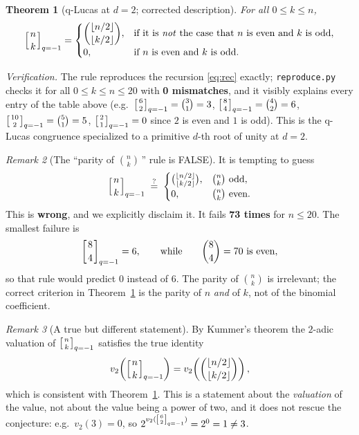 \documentclass[11pt]{article}
\newtheorem{theorem}{Theorem}
\theoremstyle{definition}
\theoremstyle{remark}
\newtheorem{remark}[theorem]{Remark}
\newcommand{\qbinm}[2]{\left[\genfrac{}{}{0pt}{}{#1}{#2}\right]_{q=-1}}
\begin{document}
\begin{theorem}[q-Lucas at $d=2$; corrected description]\label{thm:lucas}
For all $0 \le k \le n$,
\[
\qbinm{n}{k} =
\begin{cases}
\dbinom{\lfloor n/2\rfloor}{\lfloor k/2\rfloor}, & \text{if it is \emph{not}
the case that } n \text{ is even and } k \text{ is odd},\\[2mm]
0, & \text{if } n \text{ is even and } k \text{ is odd}.
\end{cases}
\]
\end{theorem}

\emph{Verification.} The rule reproduces the recursion \eqref{eq:rec} exactly;
\texttt{reproduce.py} checks it for all $0 \le k \le n \le 20$ with
\textbf{0 mismatches}, and it visibly explains every entry of the table above
(e.g.\ $\qbinm{6}{2}=\binom{3}{1}=3$, $\qbinm{8}{4}=\binom{4}{2}=6$,
$\qbinm{10}{2}=\binom{5}{1}=5$, $\qbinm{2}{1}=0$ since $2$ is even and $1$ is
odd). This is the q-Lucas congruence specialized to a primitive $d$-th root of
unity at $d=2$.

\begin{remark}[The ``parity of $\binom{n}{k}$\,'' rule is FALSE]
It is tempting to guess
\[
\qbinm{n}{k} \;\overset{?}{=}\;
\begin{cases}
\binom{\lfloor n/2\rfloor}{\lfloor k/2\rfloor}, & \binom{n}{k} \text{ odd},\\
0, & \binom{n}{k} \text{ even}.
\end{cases}
\]
This is \textbf{wrong}, and we explicitly disclaim it. It fails
\textbf{73 times} for $n \le 20$. The smallest failure is
\[
\qbinm{8}{4} = 6, \qquad\text{while}\qquad \binom{8}{4}=70 \text{ is even},
\]
so that rule would predict $0$ instead of $6$. The parity of $\binom{n}{k}$ is
irrelevant; the correct criterion in Theorem~\ref{thm:lucas} is the parity of
$n$ \emph{and} of $k$, not of the binomial coefficient.
\end{remark}

\begin{remark}[A true but different statement]
By Kummer's theorem the $2$-adic valuation of $\qbinm{n}{k}$ satisfies the true
identity
\[
v_{2}\!\left(\qbinm{n}{k}\right)
= v_{2}\!\left(\binom{\lfloor n/2\rfloor}{\lfloor k/2\rfloor}\right),
\]
which is consistent with Theorem~\ref{thm:lucas}. This is a statement about the
\emph{valuation} of the value, not about the value being a power of two, and it
does not rescue the conjecture: e.g.\ $v_{2}(3)=0$, so
$2^{v_{2}(\qbinm{6}{2})}=2^{0}=1\neq 3$.
\end{remark}
\end{document}
